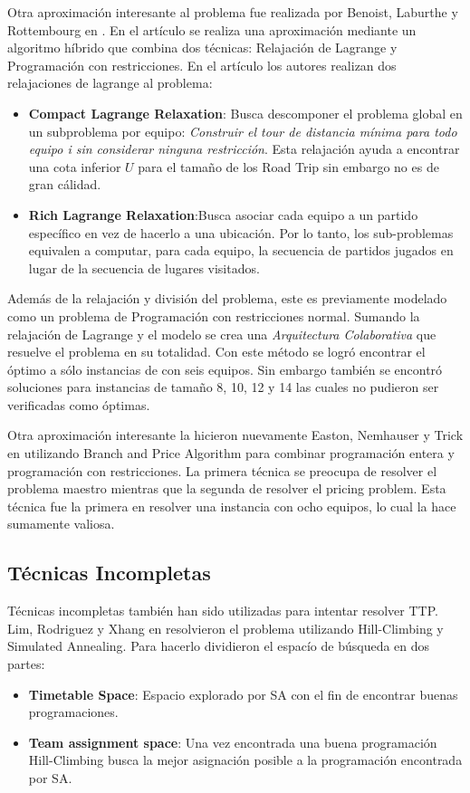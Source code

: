 \documentclass[letter, 10pt]{article}
\begin{document}
    Otra aproximación interesante al problema fue realizada por Benoist, Laburthe y Rottembourg en \cite{Lagrange}. En el artículo se realiza una aproximación mediante un algoritmo híbrido que combina dos técnicas: Relajación de Lagrange y Programación con restricciones. En el artículo los autores realizan dos relajaciones de lagrange al problema:
\begin{itemize}
    \item \textbf{Compact Lagrange Relaxation}: Busca descomponer el problema global en un subproblema por equipo: \emph{Construir el tour de distancia mínima para todo equipo i sin considerar ninguna restricción}. Esta relajación ayuda a encontrar una cota inferior $U$ para el tamaño de los Road Trip sin embargo no es de gran cálidad.
    \item \textbf{Rich Lagrange Relaxation}:Busca asociar cada equipo a un partido específico en vez de hacerlo a una ubicación. Por lo tanto, los sub-problemas equivalen a computar, para cada equipo, la secuencia de partidos jugados en lugar de la secuencia de lugares visitados.  
\end{itemize}
    Además de la relajación y división del problema, este es previamente modelado como un problema de Programación con restricciones normal. Sumando la relajación de Lagrange y el modelo se crea una \emph{Arquitectura Colaborativa} que resuelve el problema en su totalidad. Con este método se logró encontrar el óptimo a sólo instancias de con seis equipos. Sin embargo también se encontró soluciones para instancias de tamaño 8, 10, 12 y 14 las cuales no pudieron ser verificadas como óptimas.
    
    Otra aproximación interesante la hicieron nuevamente Easton, Nemhauser y Trick en \cite{Mix} utilizando Branch and Price Algorithm para combinar programación entera y programación con restricciones. La primera técnica se preocupa de resolver el problema maestro mientras que la segunda de resolver el pricing problem. Esta técnica fue la primera en resolver una instancia con ocho equipos, lo cual la hace sumamente valiosa. 

\subsection{Técnicas Incompletas}

    Técnicas incompletas también han sido utilizadas para intentar resolver TTP. Lim, Rodriguez y Xhang en \cite{Hill-Climbing-mejorado} resolvieron el problema utilizando Hill-Climbing y Simulated Annealing. Para hacerlo dividieron el espacío de búsqueda en dos partes:
\begin{itemize}
    \item \textbf{Timetable Space}: Espacio explorado por SA con el fin de encontrar buenas programaciones.
    \item \textbf{Team assignment space}: Una vez encontrada una buena programación Hill-Climbing busca la mejor asignación posible a la programación encontrada por SA.
\end{itemize}
    
\end{document}
